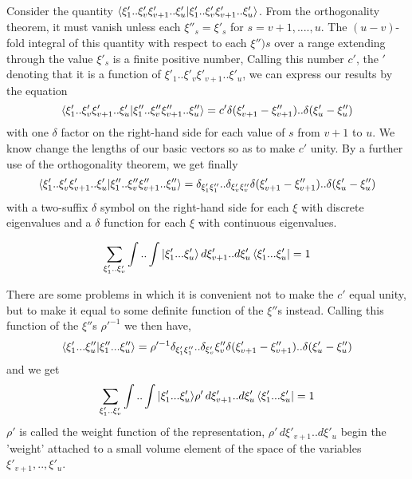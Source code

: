 Consider the quantity $\langle \xi'_1..\xi'_v\xi'_{v+1}..\xi'_u | \xi'_1..\xi'_v\xi'_{v+1}..\xi'_u \rangle$. From the orthogonality theorem, it must vanish unless each $\xi''_s = \xi'_s$ for $s = v+1, ...., u$. The $(u-v)$-fold integral of this quantity with respect to each $\xi'')s$ over a range extending through the value $\xi'_s$ is a finite positive number, Calling this number $c'$, the $'$ denoting that it is a function of $\xi'_1..\xi'_v\xi'_{v+1}..\xi'_u$, we can express our results by the equation
\begin{equation}
\langle \xi'_1..\xi'_v\xi'_{v+1}..\xi'_u | \xi''_1..\xi''_v\xi''_{v+1}..\xi''_u \rangle = c' \delta(\xi'_{v+1}-\xi''_{v+1})..\delta(\xi'_u-\xi''_u)
\end{equation}
with one $\delta$ factor on the right-hand side for each value of $s$ from $v+1$ to $u$. We know change the lengths of our basic vectors so as to make $c'$ unity. By a further use of the orthogonality theorem, we get finally
\begin{equation}
\langle \xi'_1..\xi'_v\xi'_{v+1}..\xi'_u | \xi''_1..\xi''_v\xi''_{v+1}..\xi''_u \rangle
=\delta_{\xi'_1\xi''_1}..\delta_{\xi'_v\xi''_v}\delta(\xi'_{v+1}-\xi''_{v+1})..\delta(\xi'_u-\xi''_u)
\end{equation}
with a two-suffix $\delta$ symbol on the right-hand side for each $\xi$ with discrete eigenvalues and a $\delta$ function for each $\xi$ with continuous eigenvalues. 

\begin{equation}
\sum_{\xi'_1..\xi'_v} \int..\int | \xi'_1...\xi'_u \rangle \,d\xi'_{v+1}..d\xi'_u \, \langle \xi'_1...\xi'_u | =1
\label{unitgeneralization}
\end{equation}

There are some problems in which it is convenient not to make the $c'$ equal unity, but to make it equal to some definite function of the $\xi''$s instead. Calling this function of the $\xi''$s $\rho'^{-1}$ we then have,
\begin{equation}
\langle \xi'_1...\xi''_u | \xi''_1...\xi''_u \rangle=\rho'^{-1}\delta_{\xi'_1\xi''_1}..\delta_{\xi'_v}{\xi''_v}\delta(\xi'_{v+1}-\xi''_{v+1})..\delta(\xi'_u-\xi''_u)
\end{equation}
and we get
\begin{equation}
\sum_{\xi'_1..\xi'_v} \int..\int | \xi'_1...\xi'_u \rangle \rho' \,d\xi'_{v+1}..d\xi'_u \, \langle \xi'_1...\xi'_u | =1
\end{equation}
$\rho'$ is called the weight function of the representation, $\rho' \, d\xi'_{v+1}..d\xi'_u$ begin the 'weight' attached to a small volume element of the space of the variables $\xi'_{v+1},..,\xi'_u$.

